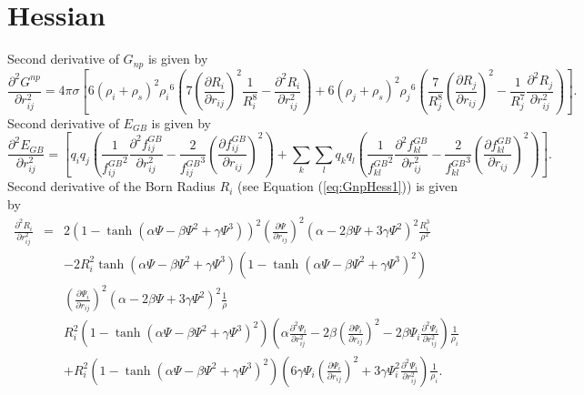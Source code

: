 \documentclass[12pt]{article}
\begin{document}
\section{Hessian}
Second derivative of $G_{np}$ is given by
\begin{equation}
\label{eq:GnpHess1}
\frac{\partial^{2} G^{np}}{\partial r_{ij}^{2}} = 4{\pi}{\sigma}\left[ 6({\rho}_{i} + {\rho}_{s})^{2}{\rho_{i}}^{6}
\left(7(\frac{\partial R_{i}}{\partial r_{ij}})^{2}\frac{1}{R_{i}^{8}} - \frac{\partial^{2}R_{i}}{\partial r_{ij}^{2}}\right)+ 6({\rho}_{j} + {\rho}_{s})^{2}{\rho_{j}}^{6} \left(\frac{7}{R_{j}^{8}}(\frac{\partial R_{j}}{\partial r_{ij}})^{2} - \frac{1}{R_{j}^{7}} \frac{\partial^{2}R_{j}}{\partial r_{ij}^{2}}\right) \right]. 
\end{equation}
Second derivative of $E_{GB}$ is given by
\begin{equation}
\frac{\partial^{2} E_{GB}}{\partial r_{ij}^{2}} = \left[ q_{i}q_{j}\left(\frac{1}{{f_{ij}^{GB}}^{2}}\frac{\partial^{2}f_{ij}^{GB}}{\partial r_{ij}^{2}} - \frac{2}{{f_{ij}^{GB}}^{3}}\left(\frac{\partial f_{ij}^{GB}}{\partial r_{ij}}\right)^{2} \right) + \displaystyle\sum_{k}\displaystyle\sum_{l}q_{k}q_{l} \left( \frac{1}{{f_{kl}^{GB}}^{2}}\frac{\partial^{2}f_{kl}^{GB}}{\partial r_{ij}^{2}} - \frac{2}{{f_{kl}^{GB}}^{3}}\left(\frac{\partial f_{kl}^{GB}}{\partial r_{ij}}\right)^{2}\right) \right].
\end{equation}
Second derivative of the Born Radius $R_{i}$ (see Equation (\ref{eq:GnpHess1})) is given by
\begin{eqnarray}
\frac{\partial^{2}R_{i}}{\partial r_{ij}^{2}} & = & 2(1 - \tanh({\alpha}{\Psi} - {\beta}{\Psi}^{2} + {\gamma}{\Psi}^{3}))^{2}(\frac{\partial {\Psi}}{\partial r_{ij}})^{2}({\alpha} - 2{\beta}{\Psi} + 3{\gamma}{\Psi}^{2})^{2}\frac{R_{i}^{3}}{\rho^{2}} \\ \nonumber
& & - 2R_{i}^{2} \tanh({\alpha}{\Psi} - {\beta}{\Psi}^{2} + {\gamma}{\Psi}^{3})(1 -{\tanh({\alpha}{\Psi} - {\beta}{\Psi}^{2} + {\gamma}{\Psi}^{3})}^{2})\\ \nonumber 
& &\left(\frac{\partial {\Psi}_{i}}{\partial r_{ij}}\right)^{2}({\alpha} - 2{\beta}{\Psi} + 3{\gamma}{\Psi}^{2})^{2}\frac{1}{\rho} \\ \nonumber
& & R_{i}^{2}(1 - \tanh({\alpha}{\Psi} - {\beta}{\Psi}^{2} + {\gamma}{\Psi}^{3})^{2})({\alpha}\frac{\partial^{2}{\Psi}_{i}}{\partial r_{ij}^{2}} - 2{\beta}(\frac{\partial {\Psi}_{i}}{\partial r_{ij}})^{2} - 2{\beta}{\Psi}_{i}\frac{\partial^{2}{\Psi}_{i}}{\partial r_{ij}^{2}})\frac{1}{{\rho}_{i}} \\ \nonumber
& & +R_{i}^{2}(1 - \tanh({\alpha}{\Psi} - {\beta}{\Psi}^{2} + {\gamma}{\Psi}^{3})^{2})( 6{\gamma}{\Psi}_{i}(\frac{\partial {\Psi}_{i}}{\partial r_{ij}})^{2} + 3{\gamma}{\Psi}_{i}^{2}\frac{\partial^{2}{\Psi}_{i}}{\partial r_{ij}^{2}})\frac{1}{{\rho}_{i}}.
\end{eqnarray}
\end{document}
